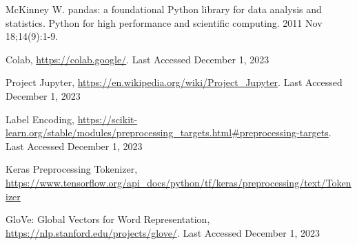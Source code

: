 \documentclass[12pt,notitlepage,oneside]{report}
\begin{document}
\begin{thebibliography}{8}
McKinney W. pandas: a foundational Python library for data analysis and statistics. Python for high performance and scientific computing. 2011 Nov 18;14(9):1-9.

Colab, \url{https://colab.google/}. Last Accessed December 1, 2023

Project Jupyter, \url{https://en.wikipedia.org/wiki/Project_Jupyter}. Last Accessed December 1, 2023

Label Encoding, \url{https://scikit-learn.org/stable/modules/preprocessing\_targets.html#preprocessing-targets}. Last Accessed December 1, 2023

Keras Preprocessing Tokenizer, \url{https://www.tensorflow.org/api\_docs/python/tf/keras/preprocessing/text/Tokenizer}

GloVe: Global Vectors for Word Representation, \url{https://nlp.stanford.edu/projects/glove/}. Last Accessed December 1, 2023

\end{thebibliography}

\printindex

\appendix
%
\end{document}
